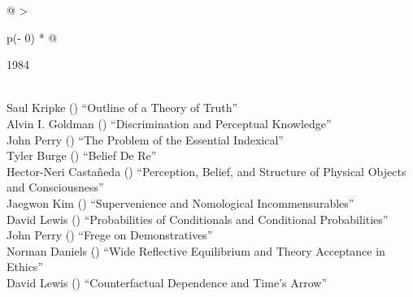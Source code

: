 \documentclass[
  10pt,
  letterpaper,
  DIV=11,
  numbers=noendperiod,
  twoside]{scrartcl}
\begin{document}
\begin{longtable}[]{@{}
  >{\raggedright\arraybackslash}p{(\columnwidth - 0\tabcolsep) * }@{}}

\caption{\label{tbl-top-ten-1975}Most cited articles published less than
ten years ago as of 1984.}

\tabularnewline

\toprule\noalign{}
\begin{minipage}[b]{\linewidth}\raggedright
1984
\end{minipage} \\
\midrule\noalign{}
\endhead
\bottomrule\noalign{}
\endlastfoot
Saul Kripke
()
``Outline of a Theory of Truth'' \\
Alvin I. Goldman
()
``Discrimination and Perceptual Knowledge'' \\
John Perry
()
``The Problem of the Essential Indexical'' \\
Tyler Burge
()
``Belief De Re'' \\
Hector-Neri Castañeda
()
``Perception, Belief, and Structure of Physical Objects and
Consciousness'' \\
Jaegwon Kim
()
``Supervenience and Nomological Incommensurables'' \\
David Lewis
()
``Probabilities of Conditionals and Conditional Probabilities'' \\
John Perry
()
``Frege on Demonstratives'' \\
Norman Daniels
()
``Wide Reflective Equilibrium and Theory Acceptance in Ethics'' \\
David Lewis
()
``Counterfactual Dependence and Time's Arrow'' \\

\end{longtable}
\end{document}
